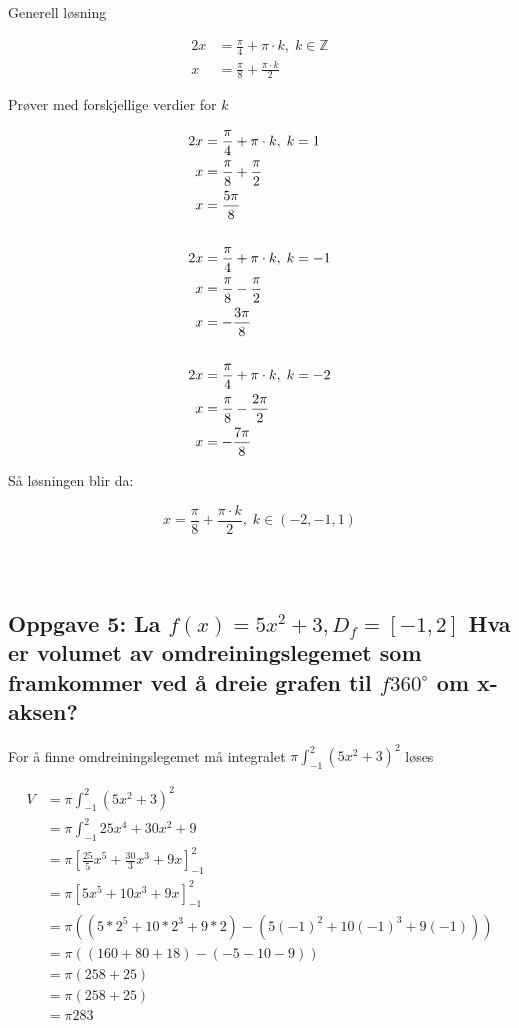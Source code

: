 \documentclass{article}
\begin{document}
Generell løsning

\begin{align*}
    2x &= \frac{\pi}{4} + \pi \cdot k, \; k \in \mathbb{Z} \\
    x &= \frac{\pi}{8} + \frac{\pi \cdot k}{2}
\end{align*}

Prøver med forskjellige verdier for $k$

\begin{align*}
    2x &= \frac{\pi}{4} + \pi \cdot k, \; k = 1 \\
    x &= \frac{\pi}{8} + \frac{\pi}{2} \\
    x &= \frac{5\pi}{8} \\
    \newline \\
    2x &= \frac{\pi}{4} + \pi \cdot k, \; k = -1 \\
    x &= \frac{\pi}{8} - \frac{\pi}{2} \\
    x &= -\frac{3\pi}{8} \\
    \newline \\
    2x &= \frac{\pi}{4} + \pi \cdot k, \; k = -2 \\
    x &= \frac{\pi}{8} - \frac{2\pi}{2} \\
    x &= -\frac{7\pi}{8} \\
\end{align*}

Så løsningen blir da:

$$ x = \frac{\pi}{8} + \frac{\pi \cdot k}{2}, \; k \in (-2, -1, 1) $$

\subsubsection{$$}

\subsection{Oppgave 5: La $f(x)=5x^2+3, D_f=[-1, 2]$ Hva er volumet av omdreiningslegemet som framkommer ved å dreie grafen til $f 360^\circ$ om x-aksen?}

For å finne omdreiningslegemet må integralet $\pi \int_{-1}^{2} (5x^2+3)^2$ løses

\begin{align*}
    V &= \pi \int_{-1}^{2} (5x^2+3)^2 \\
    &= \pi \int_{-1}^{2} 25x^4 + 30x^2 + 9 \\
    &= \pi [\frac{25}{5} x^5 + \frac{30}{3} x^3 + 9x]^2_{-1} \\
    &= \pi [5x^5 + 10 x^3 + 9x]^2_{-1} \\
    &= \pi ((5 * 2^5 + 10*2^3 + 9*2) - (5(-1)^2 + 10(-1)^3 + 9(-1))) \\
    &= \pi ((160 + 80 + 18) - (-5-10-9)) \\
    &= \pi (258 + 25) \\ 
    &= \pi (258 + 25) \\
    &= \pi 283
\end{align*}
\end{document}

